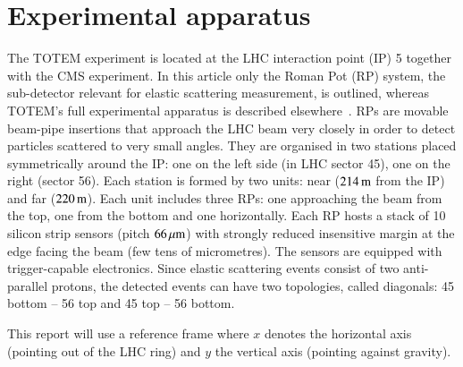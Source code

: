 \section{Experimental apparatus}

The TOTEM experiment is located at the LHC interaction point (IP) 5 together 
with the CMS experiment. In this article only the Roman Pot (RP) system, the 
sub-detector relevant for elastic scattering measurement, is outlined, 
whereas TOTEM's full experimental apparatus is described \linebreak
elsewhere~\cite{totem-jinst}. 
RPs are movable beam-pipe
insertions that approach the LHC beam very closely in order to detect particles scattered to very small angles. They are organised in two stations placed symmetrically around the IP: one on the left side (in LHC sector 45), one on the right (sector 56). Each station is formed by two units: near ($214\,{\rm m}$ from the IP) and far ($220\,{\rm m}$). Each unit includes three RPs: one approaching the beam from the top, one from the bottom and one horizontally. Each RP hosts a stack of 10 silicon strip sensors (pitch $66\,{\rm \mu m}$) with strongly reduced insensitive margin at the edge facing the beam (few tens of micrometres). The sensors are equipped with trigger-capable electronics. Since elastic scattering events consist of two anti-parallel protons, the detected events can have two topologies, called diagonals: 45 bottom -- 56 top and 45 top -- 56 bottom.

This report will use a reference frame where $x$ denotes the horizontal axis (pointing out of the LHC ring) and $y$ the vertical axis (pointing against gravity).
